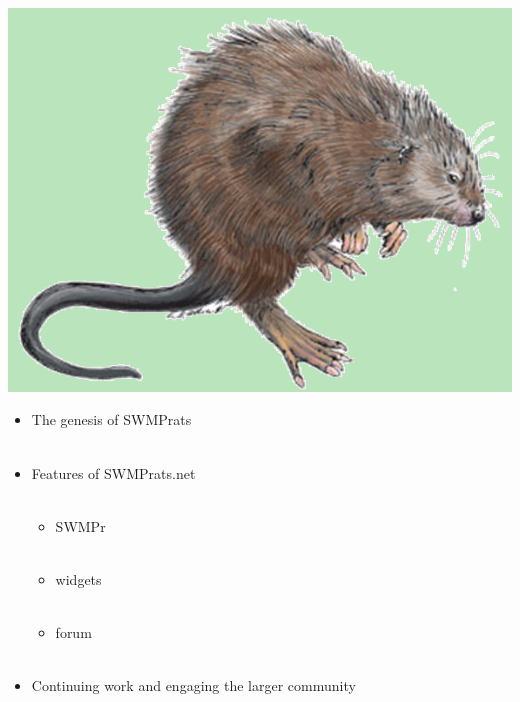 \documentclass[serif]{beamer}\usepackage[]{graphicx}\usepackage[]{color}
\begin{document}
\begin{frame}{\includegraphics[width=0.05\paperwidth]{fig/muskrat.png}\hspace{0.07in}{\bf Overview}}
\begin{itemize}
\item The genesis of SWMPrats \\~\\
\item Features of SWMPrats.net \\~\\
\begin{itemize}
\item SWMPr \\~\\
\item widgets \\~\\
\item forum \\~\\
\end{itemize}
\item Continuing work and engaging the larger community
\end{itemize}
\end{frame}
\end{document}
